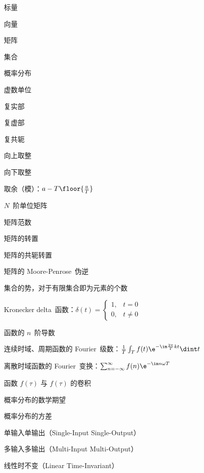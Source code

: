 
\item[{{$a, b, c, \ldots$}}] 标量
\item[{{$\vec{a}, \vec{b}, \vec{c}, \ldots$}}] 向量
\item[{{$\mat{A}, \mat{B}, \mat{C}, \ldots$}}] 矩阵
\item[{{$\mathbb{Q}, \mathbb{R}, \mathbb{C}, \ldots$}}] 集合
\item[{{$\mathcal{D}, \mathcal{E}, \mathcal{F}, \ldots$}}] 概率分布

\item %

\item[{{$\im$}}] 虚数单位
\item[{{$\Re(x)$}}] 复实部
\item[{{$\Im(x)$}}] 复虚部 
\item[{{$\overline{x}$}}] 复共轭
\item[{{$\ceil{x}$}}] 向上取整
\item[{{$\floor{x}$}}] 向下取整
\item[{{$x \bmod T$}}] 取余（模）：$a - T\floor{\frac{a}{T}}$

\item[{{$\mat{I}_{N}$}}] $N$~阶单位矩阵
\item[{{$\norm{\mat{A}}$}}] 矩阵范数
\item[{{$\mat{A}\tr$}}] 矩阵的转置
\item[{{$\mat{A}\ct$}}] 矩阵的共轭转置
\item[{{$\mat{A}^\dagger$}}] 矩阵的 Moore-Penrose~伪逆

\item[{{$\#\mathbb{S}$}}] 集合的势，对于有限集合即为元素的个数

\item[{{$\delta(t)$}}] Kronecker delta~函数：$\delta(t) = \begin{cases}
    1, & t = 0 \\
    0, & t \neq 0
\end{cases}$
\item[{{$f\sps[(n)](x)$}}] 函数的 $n$~阶导数
\item[{{$\mathcal{F}_{f}(k)$}}] 连续时域、周期函数的 Fourier~级数：$\frac{1}{T}\int_T{f(t)\e^{-\im\frac{2\pi}{T}k t}\dint t}$
\item[{{$\mathfrak{F}_{f}(\e^{\im\omega T})$}}] 离散时域函数的 Fourier~变换：$\sum_{n=-\infty}^{\infty}{f(n)\e^{-\im n\omega T}}$
\item[{{$(f \circledast g)(t)$}}] 函数 $f(\tau)$ 与 $f(\tau)$ 的卷积

\item[{{$\E\mathcal{D}$}}] 概率分布的数学期望
\item[{{$\Var\mathcal{D}$}}] 概率分布的方差

\item %

\item[{{SISO}}] 单输入单输出（Single-Input Single-Output）
\item[{{MIMO}}] 多输入多输出（Multi-Input Multi-Output）
\item[{{LTI}}] 线性时不变（Linear Time-Invariant）

